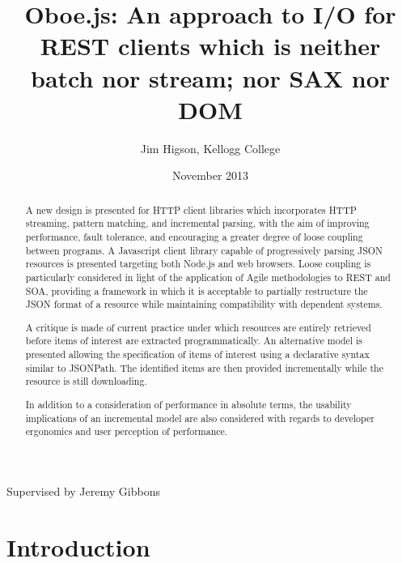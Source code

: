 \documentclass[12pt, ]{article}
\title{Oboe.js: An approach to I/O for REST clients which is neither batch nor
stream; nor SAX nor DOM}
\author{Jim Higson, Kellogg College}
\date{November 2013}
\let\stdsection\section
\renewcommand\section{\newpage\stdsection}
\begin{document}
\maketitle

\begin{center}
{\large Supervised by Jeremy Gibbons}
\end{center}

\begin{abstract}
A new design is presented for HTTP client libraries which incorporates
HTTP streaming, pattern matching, and incremental parsing, with the aim
of improving performance, fault tolerance, and encouraging a greater
degree of loose coupling between programs. A Javascript client library
capable of progressively parsing JSON resources is presented targeting
both Node.js and web browsers. Loose coupling is particularly considered
in light of the application of Agile methodologies to REST and SOA,
providing a framework in which it is acceptable to partially restructure
the JSON format of a resource while maintaining compatibility with
dependent systems.

A critique is made of current practice under which resources are
entirely retrieved before items of interest are extracted
programmatically. An alternative model is presented allowing the
specification of items of interest using a declarative syntax similar to
JSONPath. The identified items are then provided incrementally while the
resource is still downloading.

In addition to a consideration of performance in absolute terms, the
usability implications of an incremental model are also considered with
regards to developer ergonomics and user perception of performance.
\end{abstract}


{
\clearpage
\hypersetup{linkcolor=black}
\setcounter{tocdepth}{3}
\tableofcontents
}

\clearpage
\listoffigures

\clearpage

\section{Introduction}\label{introduction}
\end{document}
